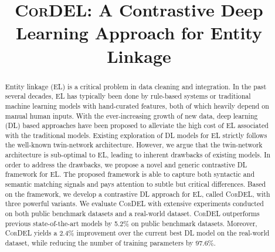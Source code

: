 \documentclass[conference]{IEEEtran}
\begin{document}
\title{\textsc{CorDEL}: A Contrastive Deep Learning Approach for Entity Linkage}

\author{
\and
{}
\and
{}
}

\maketitle

\begin{abstract}
    Entity linkage (EL) is a critical problem in data cleaning and integration. In the past several decades, EL has typically been done by rule-based systems or traditional machine learning models with hand-curated features, both of which heavily depend on manual human inputs. With the ever-increasing growth of new data, deep learning (DL) based approaches have been proposed to alleviate the high cost of EL associated with the traditional models. Existing exploration of DL models for EL strictly follows the well-known twin-network architecture. However, we argue that the twin-network architecture is sub-optimal to EL, leading to inherent drawbacks of existing models. In order to address the drawbacks, we propose a novel and generic contrastive DL framework for EL. The proposed framework is able to capture both syntactic and semantic matching signals and pays attention to subtle but critical differences. Based on the framework, we develop a contrastive DL approach for EL, called \textsc{CorDEL}, with three powerful variants. We evaluate \textsc{CorDEL} with extensive experiments conducted on both public benchmark datasets and a real-world dataset. \textsc{CorDEL} outperforms previous state-of-the-art models by 5.2$\%$ on public benchmark datasets. Moreover, \textsc{CorDEL} yields a 2.4$\%$ improvement over the current best DL model on the real-world dataset, while reducing the number of training parameters by 97.6$\%$. 
\end{abstract}
\end{document}
